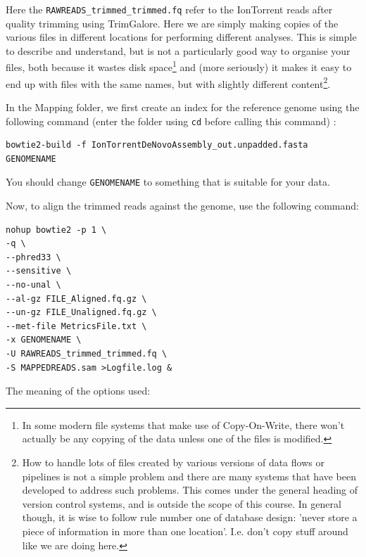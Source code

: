\documentclass[11pt]{article}
\begin{document}
Here the \texttt{RAWREADS\_trimmed\_trimmed.fq} refer to the IonTorrent reads after
quality trimming using TrimGalore. Here we are simply making copies of the
various files in different locations for performing different analyses. This is simple to describe and
understand, but is not a particularly good way to organise your files, both
because it wastes disk space\footnote{In some modern file systems that make use of Copy-On-Write, there
won't actually be any copying of the data unless one of the files is modified.} and (more seriously) it makes it
easy to end up with files with the same names, but with slightly different
content\footnote{How to handle lots of files created by various versions of data
flows or pipelines is not a simple problem and there are many systems that
have been developed to address such problems. This comes under the general
heading of version control systems, and is outside the scope of this
course. In general though, it is wise to follow rule number one of database design:
'never store a piece of information in more than one location'. I.e. don't
copy stuff around like we are doing here.}.

In the Mapping folder, we first create an index for the reference genome using the
following command (enter the folder using \texttt{cd} before calling this command) :

\begin{verbatim}
bowtie2-build -f IonTorrentDeNovoAssembly_out.unpadded.fasta GENOMENAME
\end{verbatim}

You should change \texttt{GENOMENAME} to something that is suitable for your data.

Now, to align the trimmed reads against the genome, use the following command:

\begin{verbatim}
nohup bowtie2 -p 1 \
-q \
--phred33 \
--sensitive \
--no-unal \
--al-gz FILE_Aligned.fq.gz \
--un-gz FILE_Unaligned.fq.gz \
--met-file MetricsFile.txt \
-x GENOMENAME \
-U RAWREADS_trimmed_trimmed.fq \
-S MAPPEDREADS.sam >Logfile.log &
\end{verbatim}

The meaning of the options used:
\end{document}
